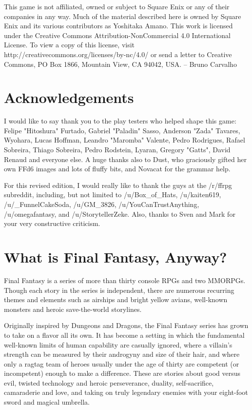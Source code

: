 This game is not affiliated, owned or subject
to Square Enix or any of their companies in any
way. Much of the material described here is owned
by Square Enix and its various contributors as
Yoshitaka Amano. This work is licensed under the
Creative Commons Attribution-NonCommercial
4.0 International License. To view a copy of this
license, visit
http://creativecommons.org/licenses/by-nc/4.0/
or send a letter to Creative Commons, PO Box 1866,
Mountain View, CA 94042, USA.
– Bruno Carvalho

\section*{Acknowledgements}
I would like to say thank you to the play
testers who helped shape this game: Felipe
"Hitoshura" Furtado, Gabriel "Paladin" Sasso,
Anderson "Zada" Tavares, Wyohara, Lucas
Hoffman, Leandro "Maromba" Valente, Pedro
Rodrigues, Rafael Sobreira, Thiago Sobreira, Pedro
Rodstein, Lyaran, Gregory "Gatts", David Renaud
and everyone else. A huge thanks also to Dust,
who graciously gifted her own FFd6 images and
lots of fluffy bits, and Novacat for the grammar
help.

For this revised edition, I would really like
to thank the guys at the /r/ffrpg subreddit,
including, but not limited to /u/Box\_of\_Hats,
/u/kaiten619, /u/\_FunnelCakeSoda, /u/GM\_3826,
/u/YouCanTrustAnything, /u/omegafantasy, and
/u/StorytellerZeke. Also, thanks to Sven and Mark
for your very constructive criticism.

\section*{What is Final Fantasy, Anyway?}
Final Fantasy is a series of more than thirty
console RPGs and two MMORPGs. Though each
story in the series is independent, there are
numerous recurring themes and elements such as
airships and bright yellow avians, well-known
monsters and heroic save-the-world storylines.

Originally inspired by Dungeons and
Dragons, the Final Fantasy series has grown to
take on a flavor all its own. It has become a setting
in which the fundamental well-known limits of
human capability are casually ignored, where a
villain’s strength can be measured by their
androgyny and size of their hair, and where only a
ragtag team of heroes usually under the age of
thirty are competent (or incompetent) enough to
make a difference. These are stories about good
versus evil, twisted technology and heroic
perseverance, duality, self-sacrifice, camaraderie
and love, and taking on truly legendary enemies
with your eight-foot sword and magical umbrella.
\endinput